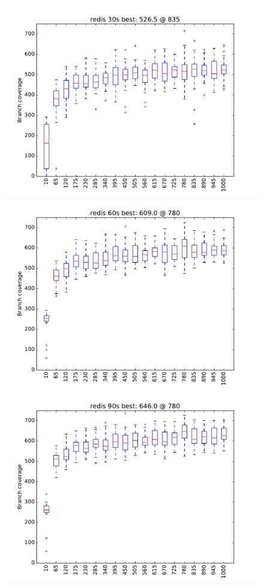 \begin{figure}
\includegraphics[width=\columnwidth]{graphs/redisrand30}
\includegraphics[width=\columnwidth]{graphs/redisrand60}
\includegraphics[width=\columnwidth]{graphs/redisrand90}
\end{figure}

